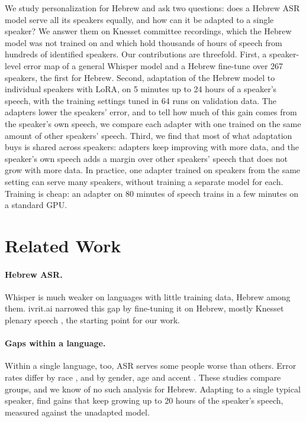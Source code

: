 \documentclass[11pt]{article}
\begin{document}
We study personalization for Hebrew and ask two questions: does a Hebrew ASR
model serve all its speakers equally, and how can it be adapted to a single
speaker? We answer them on Knesset committee recordings, which the Hebrew model
was not trained on and which hold thousands of hours of speech from hundreds of
identified speakers. Our contributions are threefold. First, a speaker-level
error map of a general Whisper model and a Hebrew fine-tune over 267 speakers,
the first for Hebrew. Second, adaptation of the Hebrew model to individual speakers
with LoRA, on 5 minutes up to 24 hours of a speaker's speech, with the training
settings tuned in 64 runs on validation data. The adapters lower the speakers'
error, and to tell how much of this gain comes from the speaker's own speech, we
compare each adapter with one trained on the same amount of other speakers'
speech. Third, we find that most of what adaptation buys is shared across
speakers: adapters keep improving with more data, and the speaker's own speech
adds a margin over other speakers' speech that does not grow
with more data. In practice, one adapter trained on speakers from the same
setting can serve many speakers, without training a separate model for each.
Training is cheap: an adapter on 80 minutes of speech
trains in a few minutes on a standard GPU.



\section{Related Work}

\paragraph{Hebrew ASR.}
Whisper \citep{radford2023whisper} is much weaker on languages with little
training data, Hebrew among them. ivrit.ai narrowed this gap \citep{marmor2025hebrewasr} by fine-tuning it on
Hebrew, mostly Knesset plenary speech \citep{ivritai2025whisperv3}, the starting
point for our work.

\paragraph{Gaps within a language.}
Within a single language, too, ASR serves some people worse than others. Error
rates differ by race \citep{koenecke2020racial}, and by gender, age and accent \citep{feng2021quantifying}. These studies compare groups, and we know of no such
analysis for Hebrew.  Adapting to a single typical speaker, \citet{weninger2019listen} find gains
that keep growing up to 20 hours of the speaker's speech, measured against the
unadapted model.
\end{document}
